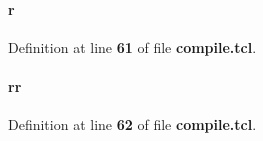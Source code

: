 \paragraph[{r}]{\setlength{\rightskip}{0pt plus 5cm}r}\label{tx__path__top_2packets2data_2compile_8tcl_a514f1b439f404f86f77090fa9edc96ce}


Definition at line {\bf 61} of file {\bf compile.\+tcl}.

\paragraph[{rr}]{\setlength{\rightskip}{0pt plus 5cm}rr}\label{tx__path__top_2packets2data_2compile_8tcl_aeb9279982226a42afdf2860dbdc29b45}


Definition at line {\bf 62} of file {\bf compile.\+tcl}.

